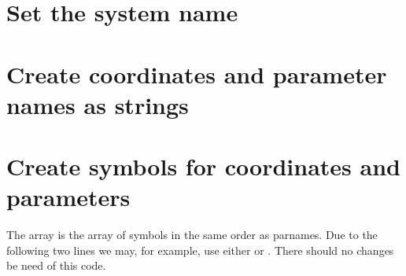 \documentclass[letterpaper,10pt,english]{jupyterBook}
\begin{document}
\section{Set the system name}
\label{\detokenize{Morris-LecarGenSym:set-the-system-name}}
\begin{sphinxVerbatim}[commandchars=\\\{\}]
\end{sphinxVerbatim}


\section{Create coordinates and parameter names as strings}
\label{\detokenize{Morris-LecarGenSym:create-coordinates-and-parameter-names-as-strings}}
\begin{sphinxVerbatim}[commandchars=\\\{\}]
\end{sphinxVerbatim}


\section{Create symbols for coordinates and parameters}
\label{\detokenize{Morris-LecarGenSym:create-symbols-for-coordinates-and-parameters}}
\sphinxAtStartPar
The array  is the array of symbols in the same order as parnames.  Due to
the following two lines we may, for example, use either  or .
There should no changes be need of this code.

\begin{sphinxVerbatim}[commandchars=\\\{\}]
\end{sphinxVerbatim}
\end{document}
